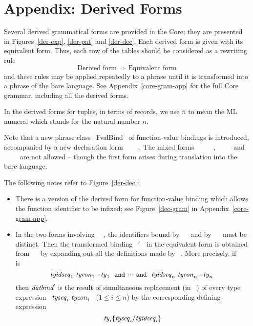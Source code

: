\section{Appendix: Derived Forms}
\label{derived-forms-app}
Several derived grammatical forms are provided in the Core; they are presented
in Figures~\ref{der-exp}, \ref{der-pat} and \ref{der-dec}. Each derived form is
given with its equivalent form. Thus, each row of the tables should be
considered as a rewriting rule
\[ \mbox{Derived form \ $\Longrightarrow$\  Equivalent form} \]
and these rules may be applied repeatedly to a phrase until it is transformed
into a phrase of the bare language.
See Appendix~\ref{core-gram-app} for the full Core grammar, including all the
derived forms.

In the derived forms for tuples, in terms of records, we use $\overline{n}$ to
mean the ML numeral which stands for the natural number $n$.

Note that a new phrase class ~FvalBind~ of function-value bindings is introduced,
accompanied by a new declaration form ~\FUN\ \tyidseq\ \fvalbind~. The mixed forms
~\VAL\ \tyidseq\ \REC\ \fvalbind~, ~\VAL\ \tyidseq\ \fvalbind~ and ~\FUN\ \tyidseq\ \valbind~ are not
allowed -- though the first form arises during translation into the bare
language.

The following notes refer to Figure~\ref{der-dec}:
\begin{itemize}
\item      There is a version of the derived form for function-value binding
	   which allows the function identifier to be infixed;
	   see Figure~\ref{dec-gram} in Appendix~\ref{core-gram-app}.
\item      In the two forms involving ~\WITHTYPE~, the identifiers bound
           by ~\datbind~ and by ~\typbind~ must be distinct. Then the
           transformed binding ~\datbind$\/'$~ in the equivalent form is
           obtained from ~\datbind~ by expanding out all the definitions
           made by ~\typbind.  More precisely, if ~\typbind~ is
           \[ \tyidseq_1\ \tycon_1\ \mbox{\ml{=}} \ty_1\ \ \AND
              \ \cdots\ \AND
            \ \ \tyidseq_n\ \tycon_n\ \mbox{\ml{=}} \ty_n\ \]
           then $\hbox{{\it datbind}}'$ is the result of simultaneous replacement
           (in ~\datbind) of every type expression ~${\it tyseq}_i\ {\it tycon}_i$~
           ($1\leq i\leq n$)
           by the corresponding defining expression
           \[  {\it ty}_i\{{\it tyseq}_i/{\it tyidseq}_i\}\]
\end{itemize}

